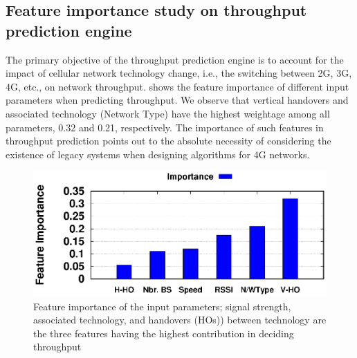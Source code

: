 \subsection{Feature importance study on throughput prediction engine} The primary objective of the throughput prediction engine is to account for the impact of cellular network technology change, i.e., the switching between 2G, 3G, 4G, etc., on network throughput.
\fig{\ref{fig:chap04:feature_imp}} shows the feature importance of different input parameters when predicting throughput. We observe that vertical handovers and associated technology (Network Type) have the highest weightage among all parameters, 0.32 and 0.21, respectively. The importance of such features in throughput prediction points out to
the absolute necessity of considering the existence of legacy systems when designing algorithms for 4G networks. 
\begin{figure}[!ht]
    \centering
    \includegraphics[width=0.7\linewidth]{new_results/simres/FeatureImpotance}
    \caption{Feature importance of the input parameters; signal strength, associated technology, and handovers (HOs)) between technology are the three features having the highest contribution in deciding throughput}\vspace*{-0.5cm}
    \label{fig:chap04:feature_imp}
\end{figure}
